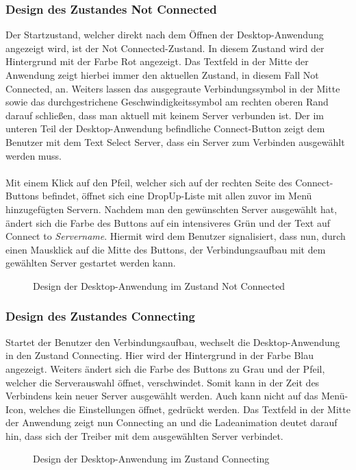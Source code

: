 \subsubsection{Design des Zustandes Not Connected}

Der Startzustand, welcher direkt nach dem Öffnen der Desktop-Anwendung angezeigt wird, ist der Not Connected-Zustand. In diesem Zustand wird der Hintergrund mit der Farbe Rot angezeigt. Das Textfeld in der Mitte der Anwendung zeigt hierbei immer den aktuellen Zustand, in diesem Fall Not Connected, an. Weiters lassen das ausgegraute Verbindungssymbol in der Mitte sowie das durchgestrichene Geschwindigkeitssymbol am rechten oberen Rand darauf schließen, dass man aktuell mit keinem Server verbunden ist. Der im unteren Teil der Desktop-Anwendung befindliche Connect-Button zeigt dem Benutzer mit dem Text Select Server, dass ein Server zum Verbinden ausgewählt werden muss.
\\ \ \\
Mit einem Klick auf den Pfeil, welcher sich auf der rechten Seite des Connect-Buttons befindet, öffnet sich eine DropUp-Liste mit allen zuvor im Menü hinzugefügten Servern. Nachdem man den gewünschten Server ausgewählt hat, ändert sich die Farbe des Buttons auf ein intensiveres Grün und der Text auf Connect to \textit{Servername}. Hiermit wird dem Benutzer signalisiert, dass nun, durch einen Mausklick auf die Mitte des Buttons, der Verbindungsaufbau mit dem gewählten Server gestartet werden kann.
\\
\begin{figure}[H]
    \centering
    \setlength{\fboxsep}{1pt}
	\setlength{\fboxrule}{1pt}
    \caption[Design der Desktop-Anwendung im Zustand Not Connected]{Design der Desktop-Anwendung im Zustand Not Connected} 
\end{figure}

\pagebreak

\subsubsection{Design des Zustandes Connecting}

Startet der Benutzer den Verbindungsaufbau, wechselt die Desktop-Anwendung in den Zustand Connecting. Hier wird der Hintergrund in der Farbe Blau angezeigt. Weiters ändert sich die Farbe des Buttons zu Grau und der Pfeil, welcher die Serverauswahl öffnet, verschwindet. Somit kann in der Zeit des Verbindens kein neuer Server ausgewählt werden. Auch kann nicht auf das Menü-Icon, welches die Einstellungen öffnet, gedrückt werden. Das Textfeld in der Mitte der Anwendung zeigt nun Connecting an und die Ladeanimation deutet darauf hin, dass sich der Treiber mit dem ausgewählten Server verbindet.
\\
\begin{figure}[H]
    \centering
    \setlength{\fboxsep}{1pt}
	\setlength{\fboxrule}{1pt}
    \caption[Design der Desktop-Anwendung im Zustand Connecting]{Design der Desktop-Anwendung im Zustand Connecting} 
\end{figure}

